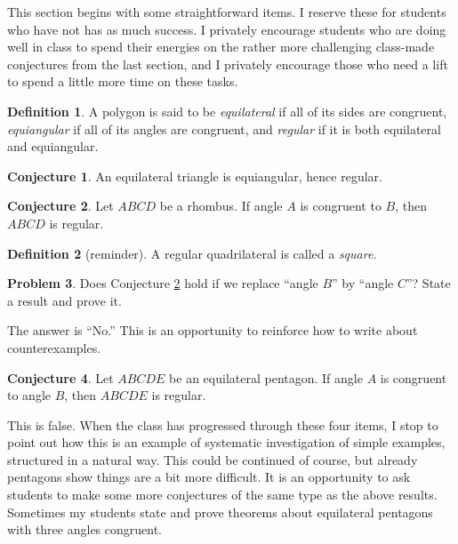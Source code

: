 \documentclass{tufte-handout}
\theoremstyle{definition}
\newtheorem{problem}{Problem}[section]
\newtheorem{conjecture}[problem]{Conjecture}
\newtheorem*{definition}{Definition}
\begin{document}
This section begins with some straightforward items. I reserve 
these for students who have not has as much success. I privately encourage students who are doing well in class to spend their energies on the rather more challenging class-made conjectures from the last section, and I privately encourage those who need a lift to spend a little more time on these tasks. 

\begin{definition}\label{defn:regular}
A polygon is said to be \emph{equilateral} if all of its sides are congruent, \emph{equiangular} if all of its angles are congruent, and \emph{regular} if it is both equilateral and equiangular.
\end{definition}

\begin{conjecture}\label{conj:equilateral-triangle}
An equilateral triangle is equiangular, hence regular.
\end{conjecture}

\begin{conjecture}\label{conj:regular-rhombus}
Let $ABCD$ be a rhombus. If angle $A$ is congruent to $B$, then $ABCD$ is regular.
\end{conjecture}

\begin{definition}[reminder]\label{defn:square}
A regular quadrilateral is called a \emph{square}.
\end{definition}


\begin{problem}\label{prob:equilateral-quad}
Does Conjecture \ref{conj:regular-rhombus} hold if we replace ``angle $B$'' by ``angle $C$''? State a result and prove it.
\end{problem}

The answer is ``No.'' This is an opportunity to reinforce how to write about counterexamples. 

\begin{conjecture}\label{conj:equilateral-pentagon}
Let $ABCDE$ be an equilateral pentagon. If angle $A$ is congruent to angle $B$, then $ABCDE$ is regular.
\end{conjecture}

This is false. When the class has progressed through these four items, I stop to point out how this is an example of 
systematic investigation of simple examples, structured in a natural way. This could be continued of course, but already pentagons show things are a bit more difficult. It is an opportunity to ask students to make some more conjectures of the same type as the above results. Sometimes my students state and prove theorems about equilateral pentagons with three angles congruent. 
\end{document}
